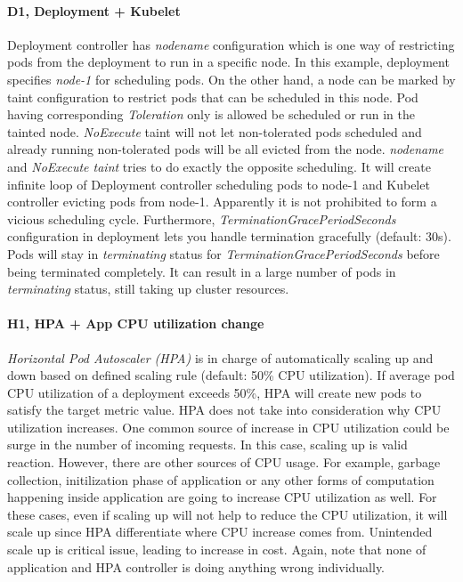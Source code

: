 \paragraph*{D1, Deployment + Kubelet}
Deployment controller has \textit{nodename} configuration which is one way of restricting pods from the deployment to run in a specific node. In this example, deployment specifies \textit{node-1} for scheduling pods.
On the other hand, a node can be marked by taint configuration to restrict pods that can be scheduled in this node. Pod having corresponding \textit{Toleration} only is allowed be scheduled or run in the tainted node. \textit{NoExecute} taint will not let non-tolerated pods scheduled and already running non-tolerated pods will be all evicted from the node.
\textit{nodename} and \textit{NoExecute taint} tries to do exactly the opposite scheduling. It will create infinite loop of Deployment controller scheduling pods to node-1 and Kubelet controller evicting pods from node-1. Apparently it is not prohibited to form a vicious scheduling cycle. Furthermore, \textit{TerminationGracePeriodSeconds} configuration in deployment lets you handle termination gracefully (default: 30s). Pods will stay in \textit{terminating} status for \textit{TerminationGracePeriodSeconds} before being terminated completely. It can result in a large number of pods in \textit{terminating} status, still taking up cluster resources. 

\paragraph*{H1, HPA + App CPU utilization change}
\textit{Horizontal Pod Autoscaler (HPA)} is in charge of automatically scaling up and down based on defined scaling rule (default: 50\% CPU utilization). If average pod CPU utilization of a deployment exceeds 50\%, HPA will create new pods to satisfy the target metric value. 
HPA does not take into consideration why CPU utilization increases. One common source of increase in CPU utilization could be surge in the number of incoming requests. In this case, scaling up is valid reaction. However, there are other sources of CPU usage. For example, garbage collection, initilization phase of application or any other forms of computation happening inside application are going to increase CPU utilization as well. For these cases, even if scaling up will not help to reduce the CPU utilization, it will scale up since HPA differentiate where CPU increase comes from. Unintended scale up is critical issue, leading to increase in cost. Again, note that none of application and HPA controller is doing anything wrong individually.

